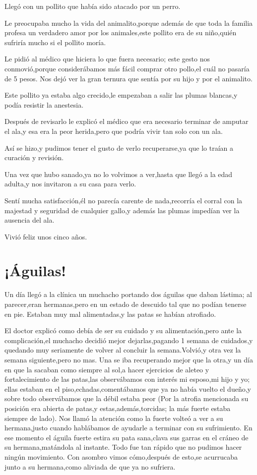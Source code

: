 \documentclass[letterpaper,12pt]{book}
\begin{document}
Llegó con un pollito que había sido atacado por un perro.

Le preocupaba mucho la vida del animalito,porque además de que toda la familia profesa un verdadero amor por los animales,este pollito era de su niño,quién sufriría mucho si el pollito moría. 

Le pidió al médico que hiciera lo que fuera necesario; este gesto nos conmovió,porque considerábamos más fácil comprar otro pollo,el cuál no pasaría de 5 pesos. Nos dejó ver la gran ternura que sentía por su hijo y por el animalito.

Este pollito ya estaba algo crecido,le empezaban a salir las plumas blancas,y podía resistir la anestesia. 

Después de revisarlo le explicó el médico que era necesario terminar de amputar el ala,y esa era la peor herida,pero que podría vivir tan solo con un ala.

Así se hizo,y pudimos tener el gusto de verlo recuperarse,ya que lo traían a curación y revisión. 

Una vez que hubo sanado,ya no lo volvimos a ver,hasta que llegó a la edad adulta,y nos invitaron a su casa para verlo.

Sentí mucha satisfacción,él no parecía carente de nada,recorría el corral con la majestad y seguridad de cualquier gallo,y además las plumas impedían ver la ausencia del ala.

Vivió feliz unos cinco años.


\chapter{¡Águilas!}
Un día llegó a la clínica un muchacho portando dos águilas que daban lástima; al parecer,eran hermanas,pero en un estado de descuido tal que no podían tenerse en pie. Estaban muy mal alimentadas,y las patas se habían atrofiado.

El doctor explicó como debía de ser su cuidado y su alimentación,pero ante la complicación,el muchacho decidió mejor dejarlas,pagando 1 semana de cuidados,y quedando muy seriamente de volver al concluir la semana.Volvió,y otra vez la semana siguiente,pero no mas. Una se iba recuperando mejor que la otra,y un día en que la sacaban como siempre al sol,a hacer ejercicios de aleteo y fortalecimiento de las patas,las observábamos con interés mi esposo,mi hijo y yo; ellas estaban en el piso,echadas,comentábamos que ya no había vuelto el dueño,y sobre todo observábamos que la débil estaba peor (Por la atrofia mencionada su posición era abierta de patas,y estas,además,torcidas; la más fuerte estaba siempre de lado). Nos llamó la  atención como la fuerte volteó a ver a su hermana,justo cuando hablábamos de ayudarle a terminar con su sufrimiento. En ese momento el águila fuerte estira su pata sana,clava sus garras en el cráneo de su hermana,matándola al instante. Todo fue tan rápido que no pudimos hacer ningún movimiento. Con asombro vimos cómo,después de esto,se acurrucaba junto a su hermana,como aliviada de que ya no sufriera.
\end{document}
